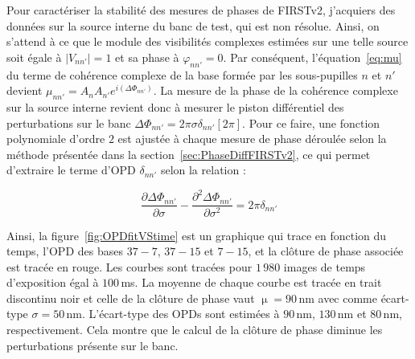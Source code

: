 Pour caractériser la stabilité des mesures de phases de \ac{FIRSTv2}, j'acquiers des données sur la source interne du banc de test, qui est non résolue. Ainsi, on s'attend à ce que le module des visibilités complexes estimées sur une telle source soit égale à $|V_{nn'}| = 1$ et sa phase à $\varphi_{nn'} = 0$. Par conséquent, l'équation~\ref{eq:mu} du terme de cohérence complexe de la base formée par les sous-pupilles $n$ et $n'$ devient $\mu_{nn'} = A_n A_{n'} e^{i(\Delta\Phi_{nn'})}$. La mesure de la phase de la cohérence complexe sur la source interne revient donc à mesurer le piston différentiel des perturbations sur le banc $\Delta\Phi_{nn'} = 2 \pi \sigma \delta_{nn'} [2 \pi]$. Pour ce faire, une fonction polynomiale d'ordre $2$ est ajustée à chaque mesure de phase déroulée selon la méthode présentée dans la section~\ref{sec:PhaseDiffFIRSTv2}, ce qui permet d'extraire le terme d'\ac{OPD} $\delta_{nn'}$ selon la relation :

\begin{equation}
    \frac{\partial \Delta\Phi_{nn'}}{\partial \sigma} - \frac{\partial^2 \Delta\Phi_{nn'}}{\partial \sigma^2} = 2 \pi \delta_{nn'}
\end{equation}

Ainsi, la figure~\ref{fig:OPDfitVStime} est un graphique qui trace en fonction du temps, l'\ac{OPD} des bases $37-7$, $37-15$ et $7-15$, et la clôture de phase \citep{weigelt1977, lohmann1983} associée est tracée en rouge. Les courbes sont tracées pour $1\,980$ images de temps d'exposition égal à $100 \,$ms. La moyenne de chaque courbe est tracée en trait discontinu noir et celle de la clôture de phase vaut $\upmu = 90 \,$nm avec comme écart-type $\sigma = 50 \,$nm. L'écart-type des \ac{OPD}s sont estimées à $90 \,$nm, $130 \,$nm et $80 \,$nm, respectivement. Cela montre que le calcul de la clôture de phase diminue les perturbations présente sur le banc.

